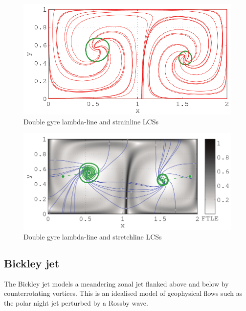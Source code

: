 \documentclass{article}
\begin{document}
\begin{figure}
  \centering
  \includegraphics[width=\textwidth]{graphics/double_gyre/lambda_strain_lcs}
  \caption{Double gyre lambda-line and strainline LCSs}
  \label{fig:double_gyre_lambda_strain_lcs}
\end{figure}

\begin{figure}
  \centering
  \includegraphics[width=\textwidth]{graphics/double_gyre/lambda_stretch_lcs}
  \caption{Double gyre lambda-line and stretchline LCSs}
  \label{fig:double_gyre_lambda_stretch_lcs}
\end{figure}



\clearpage

\subsection{Bickley jet}

The Bickley jet models a meandering zonal jet flanked above and below by
counterrotating vortices. This is an idealised model of geophysical flows
such as the polar night jet perturbed by a Rossby
wave\parencite{haller12:_geodes_theor_trans_barrier_two_dimen_flows,beron-vera10:_invar_lagran}.
\end{document}
